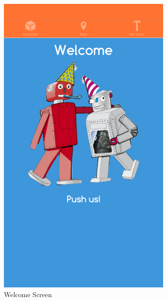 \begin{figure}[H]
  \begin{minipage}[b]{0.35\textwidth}
    \includegraphics[width=\textwidth]{images/app/welcomeScreen.png}
    \caption{Welcome Screen}
  \end{minipage}
  \hfill
  \begin{minipage}[b]{0.35\textwidth}

\end{minipage}
\end{figure}
